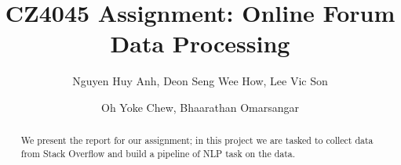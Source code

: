 \documentclass[sigconf]{acmart}
\begin{document}
\title{CZ4045 Assignment: Online Forum Data Processing}

\author{Nguyen Huy Anh, Deon Seng Wee How, Lee Vic Son}
\author{Oh Yoke Chew, Bhaarathan Omarsangar}

\begin{abstract}
We present the report for our assignment; in this project we are tasked to
collect data from Stack Overflow and build a pipeline of NLP task on the data.
\end{abstract}

\renewcommand\footnotetextcopyrightpermission[1]{}
\pagestyle{plain}

\maketitle




 
\end{document}
